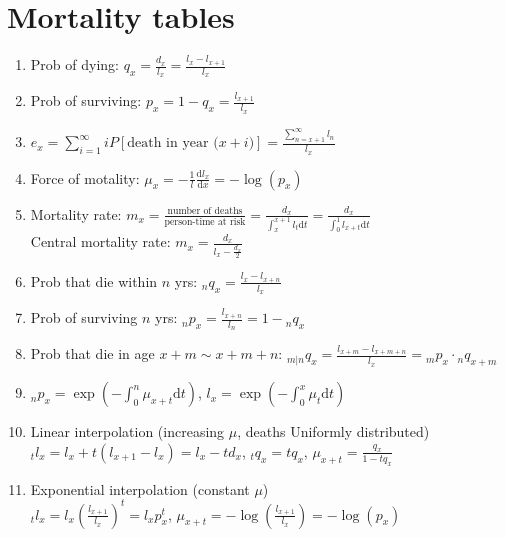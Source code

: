\documentclass[11pt,a4paper]{article}
\begin{document}
\section*{Mortality tables}
\begin{enumerate}[resume]

\item Prob of dying: $q_x = \frac{d_x}{l_x} = \frac{l_x - l_{x+1}}{l_x}$

\item Prob of surviving: $p_x = 1 - q_x = \frac{l_{x+1}}{l_x}$

\item $\displaystyle e_x = \sum_{i=1}^{\infty} i P[\text{death in year (} x+i \text{)}] = \frac{\sum_{n=x+1}^{\infty} l_n}{l_x}$

\item Force of motality: $\mu_x = - \frac{1}{l} \frac{\text{d} l_x}{\text{d} x} = - \log{(p_x)}$

\item Mortality rate: $\displaystyle m_x = \frac{\text{number of deaths}}{\text{person-time at risk}} = \frac{d_x}{\int_x^{x+1} l_t \mathrm{d} t} = \frac{d_x}{\int_0^1 l_{x+t} \mathrm{d} t}$ \\
Central mortality rate: $\displaystyle m_x = \frac{d_x}{l_x - \frac{d_x}{2}}$

\item Prob that die within $n$ yrs: ${}_n q_x = \frac{l_x - l_{x+n}}{l_x}$

\item Prob of surviving $n$ yrs: ${}_n p_x = \frac{l_{x+n}}{l_n} = 1 - {}_n q_x$

\item Prob that die in age $x+m \sim x+m+n$: $\displaystyle {}_{m|n} q_x = \frac{l_{x+m} - l_{x+m+n}}{l_x} = {}_m p_x \cdot {}_n q_{x+m}$

\item $\displaystyle {}_n p_x = \exp{\left(- \int_0^n \mu_{x+t} \mathrm{d} t \right)}$, $\displaystyle l_x = \exp{\left(- \int_0^x \mu_t \mathrm{d} t \right)}$

\item Linear interpolation (increasing $\mu$, deaths Uniformly distributed) \\
${}_t l_x = l_x + t \left( l_{x+1} - l_x \right) = l_x - t d_x$, ${}_t q_x = t q_x$, $\mu_{x+t} = \frac{q_x}{1 - t q_x}$

\item Exponential interpolation (constant $\mu$) \\
$\displaystyle {}_t l_x = l_x \left( \frac{l_{x+1}}{l_x} \right)^t = l_x p_x^t$, $\displaystyle \mu_{x+t} = - \log \left( \frac{l_{x+1}}{l_x} \right) = - \log \left( p_x \right)$


\end{enumerate}
\end{document}
